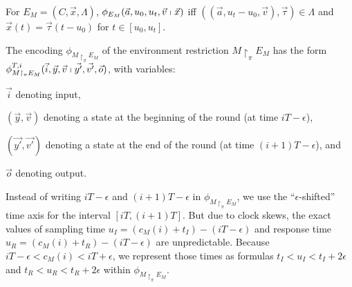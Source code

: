 \begin{definition}
For %
$E_M = (C, \vec{x}, \Lambda)$,
$\phi_{E_M}(\vec{a},u_0,u_t,\vec{v} \shortmid \vec{x})$
iff
$((\vec{a},u_t-u_0,\vec{v}), \vec{\tau}) \in \Lambda$
and $\vec{x}(t) = \vec{\tau}(t - u_0)$ for $t \in [u_0, u_t]$.
\end{definition}

The encoding $\phi_{M \restriction_\pi E_M}$ of the 
 environment restriction $M \restriction_\pi E_M$
has the form
$\phi_{M \restriction_\pi E_M}^{T,i}(\vec{i}, \vec{y}, \vec{v} \shortmid \vec{y'}, \vec{v'}, \vec{o})$,
with variables:
\begin{inparaenum}[(i)]
	\item $\vec{i}$ denoting input, 
	\item $(\vec{y},\vec{v})$ denoting a state  at the beginning of the round 
		(at time $iT - \epsilon$),
	\item $(\vec{y'},\vec{v'})$ denoting a state at the end of the round 
		(at time $(i+1)T - \epsilon$), and 
	\item $\vec{o}$ denoting output.
\end{inparaenum}
%
Instead of  writing $iT - \epsilon$ and $(i+1)T - \epsilon$  in $\phi_{M \restriction_\pi E_M}$,
we use the ``$\epsilon$-shifted''  time axis for the interval $[iT, (i+1)T]$. %
%
But due to clock skews, 
the exact values of sampling time $u_I = (c_M(i)+t_I)-(iT-\epsilon)$
and response time $u_R = (c_M(i)+t_R)-(iT-\epsilon)$ are unpredictable. 
Because $iT - \epsilon < c_M(i) < iT + \epsilon$,
we represent those times as formulas 
$t_I < u_I < t_I + 2\epsilon$ and $t_R < u_R < t_R + 2\epsilon$
within $\phi_{M \restriction_\pi E_M}$.






